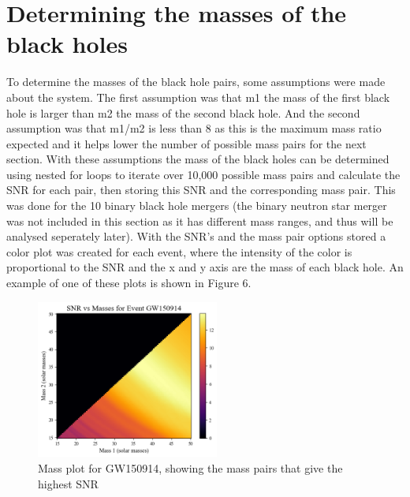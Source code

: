 \documentclass[]{article}
\begin{document}
\section*{Determining the masses of the black holes}
To determine the masses of the black hole pairs, some assumptions were made
about the system. The first assumption was that m1 the mass of the first black hole is larger
than m2 the mass of the second black hole. And the second assumption was that m1/m2 is less than 8
as this is the maximum mass ratio expected and it helps lower the number of possible mass pairs
for the next section. With these assumptions the mass of the black holes can be determined using
nested for loops to iterate over 10,000 possible mass pairs and calculate the SNR for each pair, then storing this
SNR and the corresponding mass pair. This was done for the 10 binary black hole mergers (the binary neutron star
merger was not included in this section as it has different mass ranges, and thus will be analysed seperately
later). With the SNR's and the mass pair options stored a color plot was created for each event, where
the intensity of the color is proportional to the SNR and the x and y axis are the mass of each black hole.
An example of one of these plots is shown in Figure 6.
\begin{figure}[h]
    \includegraphics[width=6cm]{images/snr_color.png}
    \caption{Mass plot for GW150914, showing the mass pairs that give the highest SNR}
    \label{fig:mass_plot}
\end{figure}
\newline
\end{document}
